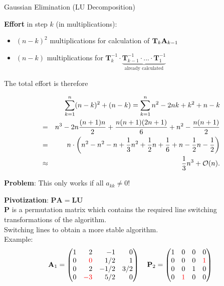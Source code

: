 \documentclass[11pt,compress,t,notes=noshow, xcolor=table]{beamer}
\begin{document}
\begin{vbframe}{Gaussian Elimination (LU Decomposition)}
\begin{enumerate}
\normalsize

\framebreak

\textbf{Effort} in step $k$ (in multiplications):

\begin{itemize}
\item $(n - k)^2$ multiplications for calculation of $\mathbf{T}_k\mathbf{A}_{k - 1}$
\item $(n-k)$ multiplications for $\mathbf{T}_k^{-1}\cdot \underbrace{\mathbf{T}_{k-1}^{-1} \cdot ... \cdot \mathbf{T}_{1}^{-1}}_{\text{already calculated}}$
\end{itemize}

The total effort is therefore

\vspace*{-0.3cm}

\begin{eqnarray*}
& &\sum_{k=1}^n (n - k)^2 + (n - k) = \sum_{k=1}^n n^2 - 2 n k + k^2 + n - k \\
&=& n^3 - 2n \frac{(n + 1)n}{2} + \frac{n(n + 1)(2n + 1)}{6} + n^2 - \frac{n(n+1)}{2} \\
&=& n \cdot \biggl(n^2 - n^2 - n + \frac{1}{3}n^2 + \frac{1}{2} n + \frac{1}{6} + n - \frac{1}{2} n - \frac{1}{2}\biggr) \\
&\approx& \frac{1}{3}n^3 + \mathcal{O}(n).
\end{eqnarray*}

\framebreak

\textbf{Problem}: This only works if all $a_{kk} \not= 0$!

\medskip
\textbf{Pivotization}: $\mathbf{PA} = \mathbf{LU}$\\
\medskip
$\mathbf{P}$ is a permutation matrix which contains the required line switching transformations of the algorithm. \\
\medskip
Switching lines to obtain a more stable algorithm.\\
\medskip
Example: \scriptsize
$$
\Amat_1 = \begin{pmatrix*}[r]
1 &  2 & -1   & 0 \\
0 &  \color{red}{0} & 1/2  & 1 \\
0 &  2 & -1/2 & 3/2 \\
0 & \color{red}{-3} & 5/2  & 0 \end{pmatrix*}
\quad
\mathbf{P}_2 =
\mat{
1 & 0 & 0 & 0 \\
0 & 0 & 0 & \color{red}{1} \\
0 & 0 & 1 & 0 \\
0 & \color{red}{1} & 0 & 0 }
$$


\end{enumerate}
\end{vbframe}
\end{document}
